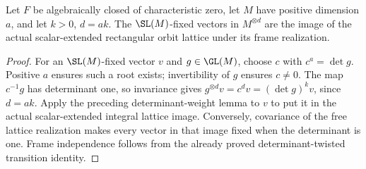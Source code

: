 \begin{lemma}
\label{lem:rectangular-tensor-span-algclosed}
\leanok
Let $F$ be algebraically closed of characteristic zero, let $M$ have
positive dimension $a$, and let $k>0$, $d=ak$. The $\SL(M)$-fixed vectors
in $M^{\otimes d}$ are the image of the actual scalar-extended rectangular
orbit lattice under its frame realization.
\end{lemma}
\begin{proof}
For an $\SL(M)$-fixed vector $v$ and $g\in\GL(M)$, choose $c$ with
$c^a=\det g$. Positive $a$ ensures such a root exists; invertibility
of $g$ ensures $c\ne0$. The map $c^{-1}g$ has determinant one, so
invariance gives $g^{\otimes d}v=c^dv=(\det g)^kv$, since $d=ak$.
Apply the preceding determinant-weight lemma to $v$ to put it in the
actual scalar-extended integral lattice image. Conversely, covariance of
the free lattice realization makes every vector in that image fixed
when the determinant is one. Frame independence follows from the
already proved determinant-twisted transition identity.
\end{proof}

